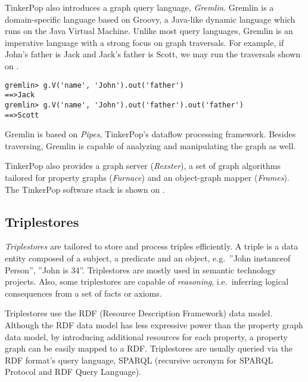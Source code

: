  
TinkerPop also introduces a graph query language, \textit{Gremlin}. Gremlin is a domain-specific language based on Groovy, a Java-like dynamic language which runs on the Java Virtual Machine. Unlike most query languages, Gremlin is an imperative language with a strong focus on graph traversals. For example, if John's father is Jack and Jack's father is Scott, we may run the traversals shown on .

\begin{lstlisting}[caption=Simple Gremlin queries, label=lst:gremlin-queries]
gremlin> g.V('name', 'John').out('father')
==>Jack
gremlin> g.V('name', 'John').out('father').out('father')
==>Scott
\end{lstlisting}


Gremlin is based on \textit{Pipes}, TinkerPop's dataflow processing framework. Besides traversing, Gremlin is capable of analyzing and manipulating the graph as well.

TinkerPop also provides a graph server (\textit{Rexster}), a set of graph algorithms tailored for property graphs (\textit{Furnace}) and an object-graph mapper (\textit{Frames}). The TinkerPop software stack is shown on .


\subsection{Triplestores}

\textit{Triplestores} are tailored to store and process triples efficiently. A triple is a data entity composed of a subject, a predicate and an object, e.g.\ ''John instanceof Person'', ''John is 34''. Triplestores are mostly used in semantic technology projects. Also, some triplestores are capable of \emph{reasoning}, i.e.\ inferring logical consequences from a set of facts or axioms. 

Triplestores use the RDF (Resource Description Framework) data model. Although the RDF data model has less expressive power than the property graph data model, by introducing additional resources for each property, a property graph can be easily mapped to a RDF. Triplestores are usually queried via the RDF format's query language, SPARQL (recursive acronym for SPARQL Protocol and RDF Query Language). 


